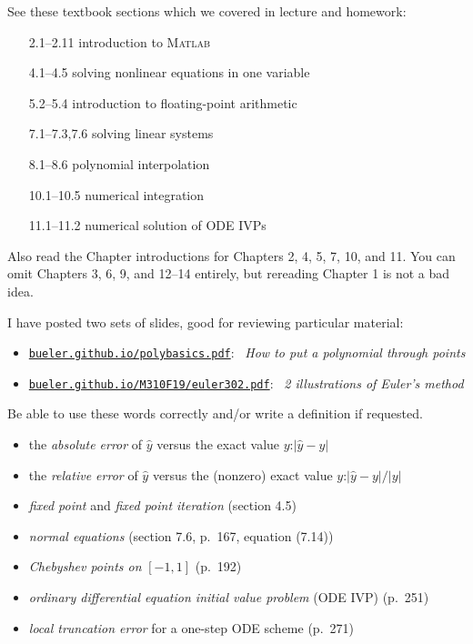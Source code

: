 \documentclass[12pt]{amsart}
\newcommand{\Matlab}{\textsc{Matlab}\xspace}
\begin{document}
  See these textbook sections which we covered in lecture and homework:
\begin{itemize}[leftmargin=25mm,labelsep=5mm]
\item[2.1--2.11]     introduction to \Matlab
\item[4.1--4.5]      solving nonlinear equations in one variable
\item[5.2--5.4]      introduction to floating-point arithmetic
\item[7.1--7.3,7.6]  solving linear systems
\item[8.1--8.6]      polynomial interpolation
\item[10.1--10.5]    numerical integration
\item[11.1--11.2]    numerical solution of ODE IVPs
\end{itemize}

\noindent Also read the Chapter introductions for Chapters 2, 4, 5, 7, 10, and 11.  You can omit Chapters 3, 6, 9, and 12--14 entirely, but rereading Chapter 1 is not a bad idea.

  I have posted two sets of slides, good for reviewing particular material:
    \begin{itemize}
    \item \href{http://bueler.github.io/polybasics.pdf}{\texttt{bueler.github.io/polybasics.pdf}}: \, \emph{How to put a polynomial through points}
    \item \href{http://bueler.github.io/M310F19/euler302.pdf}{\texttt{bueler.github.io/M310F19/euler302.pdf}}: \, \emph{2 illustrations of Euler's method}
    \end{itemize}

\newpage
{}  Be able to use these words correctly and/or write a definition if requested.
  \begin{itemize}
  \item  the \emph{absolute error} of $\hat y$ versus the exact value $y$:\quad $|\hat y - y|$
  \item  the \emph{relative error} of $\hat y$ versus the (nonzero) exact value $y$:\quad $|\hat y - y|/|y|$  
  \item  \emph{fixed point} and \emph{fixed point iteration}  (section 4.5)
  \item \emph{normal equations} (section 7.6, p.~167, equation (7.14))
  \item \emph{Chebyshev points on} $[-1,1]$ (p.~192)
  \item \emph{ordinary differential equation initial value problem} (ODE IVP) (p.~251)
  \item \emph{local truncation error} for a one-step ODE scheme (p.~271)
  \end{itemize}
\end{document}
